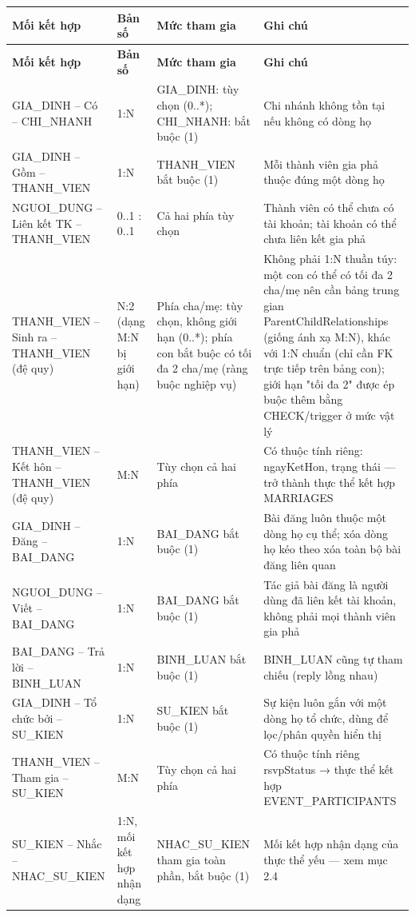\begin{longtable}{|p{}|p{}|p{}|p{}|}
\hline
\textbf{Mối kết hợp} & \textbf{Bản số} & \textbf{Mức tham gia} & \textbf{Ghi chú} \\ \hline
\endfirsthead
\hline
\textbf{Mối kết hợp} & \textbf{Bản số} & \textbf{Mức tham gia} & \textbf{Ghi chú} \\ \hline
\endhead
GIA\_DINH – Có – CHI\_NHANH & 1:N & GIA\_DINH: tùy chọn (0..*); CHI\_NHANH: bắt buộc (1) & Chi nhánh không tồn tại nếu không có dòng họ \\ \hline
GIA\_DINH – Gồm – THANH\_VIEN & 1:N & THANH\_VIEN bắt buộc (1) & Mỗi thành viên gia phả thuộc đúng một dòng họ \\ \hline
NGUOI\_DUNG – Liên kết TK – THANH\_VIEN & 0..1 : 0..1 & Cả hai phía tùy chọn & Thành viên có thể chưa có tài khoản; tài khoản có thể chưa liên kết gia phả \\ \hline
THANH\_VIEN – Sinh ra – THANH\_VIEN (đệ quy) & N:2 (dạng M:N bị giới hạn) & Phía cha/mẹ: tùy chọn, không giới hạn (0..*); phía con bắt buộc có tối đa 2 cha/mẹ (ràng buộc nghiệp vụ) & Không phải 1:N thuần túy: một con có thể có tối đa 2 cha/mẹ nên cần bảng trung gian ParentChildRelationships (giống ánh xạ M:N), khác với 1:N chuẩn (chỉ cần FK trực tiếp trên bảng con); giới hạn "tối đa 2" được ép buộc thêm bằng CHECK/trigger ở mức vật lý \\ \hline
THANH\_VIEN – Kết hôn – THANH\_VIEN (đệ quy) & M:N & Tùy chọn cả hai phía & Có thuộc tính riêng: ngayKetHon, trạng thái — trở thành thực thể kết hợp MARRIAGES \\ \hline
GIA\_DINH – Đăng – BAI\_DANG & 1:N & BAI\_DANG bắt buộc (1) & Bài đăng luôn thuộc một dòng họ cụ thể; xóa dòng họ kéo theo xóa toàn bộ bài đăng liên quan \\ \hline
NGUOI\_DUNG – Viết – BAI\_DANG & 1:N & BAI\_DANG bắt buộc (1) & Tác giả bài đăng là người dùng đã liên kết tài khoản, không phải mọi thành viên gia phả \\ \hline
BAI\_DANG – Trả lời – BINH\_LUAN & 1:N & BINH\_LUAN bắt buộc (1) & BINH\_LUAN cũng tự tham chiếu (reply lồng nhau) \\ \hline
GIA\_DINH – Tổ chức bởi – SU\_KIEN & 1:N & SU\_KIEN bắt buộc (1) & Sự kiện luôn gắn với một dòng họ tổ chức, dùng để lọc/phân quyền hiển thị \\ \hline
THANH\_VIEN – Tham gia – SU\_KIEN & M:N & Tùy chọn cả hai phía & Có thuộc tính riêng rsvpStatus → thực thể kết hợp EVENT\_PARTICIPANTS \\ \hline
SU\_KIEN – Nhắc – NHAC\_SU\_KIEN & 1:N, mối kết hợp nhận dạng & NHAC\_SU\_KIEN tham gia toàn phần, bắt buộc (1) & Mối kết hợp nhận dạng của thực thể yếu — xem mục 2.4 \\ \hline
\end{longtable}


